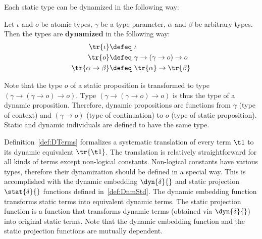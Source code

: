 Each static type can be dynamized in the following way:
\begin{definition}\label{def:DTypes-FO} Let $\iota$ and $o$ be atomic types, $\gamma$ be a type parameter, $\alpha$ and $\beta$ be arbitrary types. Then the types are \textbf{dynamized} in the following way:
\begin{subequations}
\begin{align}
\tr{\iota} \defeq \ &  \iota  \label{def:DTypes-FO:iota}\\
 \tr{o} \defeq \ & \gamma \rightarrow (\gamma \rightarrow o) \rightarrow o \label{def:DTypes-FO:o}\\
  \tr{\alpha \rightarrow \beta} \defeq \ & \tr{\alpha}  \rightarrow \tr{\beta} \label{def:DTypes-FO:atob}
\end{align}
\end{subequations}
\end{definition}
Note that the type $o$ of a static proposition is transformed to type $(\gamma \rightarrow (\gamma \rightarrow o) \rightarrow o)$. Type $(\gamma \rightarrow (\gamma \rightarrow o) \rightarrow o)$ is thus the type of a dynamic proposition. Therefore, dynamic propositions are functions from $\gamma$ (type of context) and $(\gamma \rightarrow o)$ (type of continuation) to $o$ (type of static proposition).
Static and dynamic individuals are defined to have the same type.

Definition~\ref{def:DTerms} formalizes a systematic translation of every term $\t1$ to its dynamic equivalent $\tr{\t1}$. The translation is relatively straightforward for all kinds of terms except non-logical constants. Non-logical constants have various types, therefore their dynamization should be defined in a special way. This is accomplished with the dynamic embedding $\dyn{\delta}{}$ and static projection $\stat{\delta}{}$ functions defined in~\ref{def:DnmStd}. The dynamic embedding function transforms static terms into equivalent dynamic terms. The static projection function is a function that transforms dynamic terms (obtained via $\dyn{\delta}{}$) into original static terms. Note that the dynamic embedding function and the static projection functions are mutually dependent.


